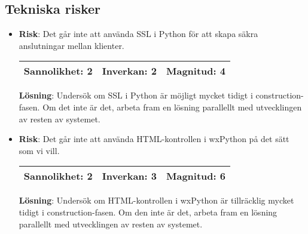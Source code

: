\subsection{Tekniska risker}
\begin{itemize}
\item \textbf{Risk}: Det går inte att använda SSL i Python för att skapa säkra anslutningar mellan klienter.

\begin{tabular}{ | l | l | l |}
	\hline
	Sannolikhet: 2 & Inverkan: 2 & Magnitud: 4 \\ \hline
\end{tabular}

\textbf{Lösning}: Undersök om SSL i Python är möjligt mycket tidigt i construction-fasen. Om det inte är det, arbeta fram en lösning parallellt med utvecklingen av resten av systemet.
\item \textbf{Risk}: Det går inte att använda HTML-kontrollen i wxPython på det sätt som vi vill.

\begin{tabular}{ | l | l | l |}
	\hline
	Sannolikhet: 2 & Inverkan: 3 & Magnitud: 6 \\ \hline
\end{tabular}

\textbf{Lösning}: Undersök om HTML-kontrollen i wxPython är tillräcklig mycket tidigt i construction-fasen. Om den inte är det, arbeta fram en lösning parallellt med utvecklingen av resten av systemet.
\end{itemize}



